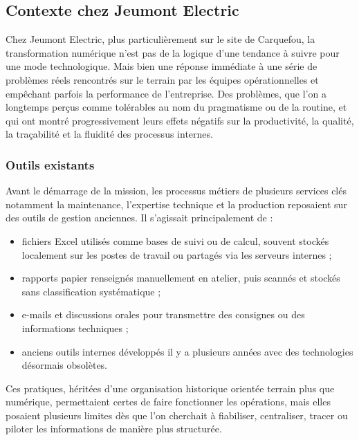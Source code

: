 \documentclass[11pt,a4paper]{article}
\begin{document}
\subsection{Contexte chez Jeumont Electric}

Chez Jeumont Electric, plus particulièrement sur le site de Carquefou, la transformation numérique n’est pas de la logique d’une tendance à suivre pour une mode technologique. Mais bien une réponse immédiate à une série de problèmes réels rencontrés sur le terrain par les équipes opérationnelles et empêchant parfois la performance de l’entreprise. Des problèmes, que l’on a longtemps perçus comme tolérables au nom du pragmatisme ou de la routine, et qui ont montré progressivement leurs effets négatifs sur la productivité, la qualité, la traçabilité et la fluidité des processus internes.

\subsubsection{Outils existants}

Avant le démarrage de la mission, les processus métiers de plusieurs services clés notamment la maintenance, l’expertise technique et la production reposaient sur des outils de gestion anciennes. Il s’agissait principalement de :

\begin{itemize}
    \item fichiers Excel utilisés comme bases de suivi ou de calcul, souvent stockés localement sur les postes de travail ou partagés via les serveurs internes ;
    \item rapports papier renseignés manuellement en atelier, puis scannés et stockés sans classification systématique ;
    \item e-mails et discussions orales pour transmettre des consignes ou des informations techniques ;
    \item anciens outils internes développés il y a plusieurs années avec des technologies désormais obsolètes.
\end{itemize}

Ces pratiques, héritées d’une organisation historique orientée terrain plus que numérique, permettaient certes de faire fonctionner les opérations, mais elles posaient plusieurs limites dès que l’on cherchait à fiabiliser, centraliser, tracer ou piloter les informations de manière plus structurée.
\end{document}
